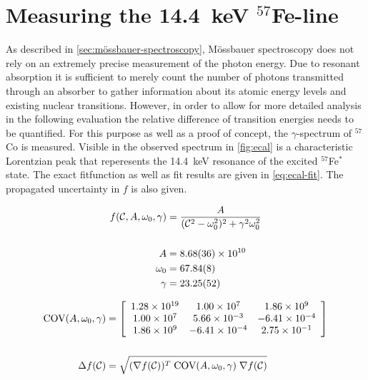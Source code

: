 
\section{Measuring the \SI{14.4}{\kilo\electronvolt} $^{57}$Fe-line}
\label{sec:ecal}

As described in \autoref{sec:mössbauer-spectroscopy}, Mössbauer spectroscopy does not
rely on an extremely precise measurement of the photon energy. Due to resonant
absorption it is sufficient to merely count the number of photons transmitted through
an absorber to gather information about its atomic energy levels and existing nuclear
transitions. However, in order to allow for more detailed analysis in the following
evaluation the relative difference of transition energies needs to be quantified.
For this purpose as well as a proof of concept, the $\gamma$-spectrum of $^{57}$Co is
measured. Visible in the observed spectrum in \autoref{fig:ecal} is a characteristic
Lorentzian peak that reperesents the \SI{14.4}{\kilo\electronvolt} resonance of the 
excited $^{57}$Fe$^{*}$ state. The exact fitfunction as well as fit results are given
in \autoref{eq:ecal-fit}. The propagated uncertainty in $f$ is also given.

\begin{align}
\label{eq:ecal-fit}
f(\mathcal{C},A,\omega_0,\gamma) &= \frac{A}{(\mathcal{C}^2-\omega_0^2)^2 + \gamma^2\omega_0^2} \\[15pt]
A &= \SI{8.68\pm 0.36e+10}{} \\
\omega_0 &= \SI{67.84\pm 0.08}{} \\
\gamma &= \SI{23.25\pm 0.52}{}
\end{align}

\begin{align*}
\text{COV}(A,\omega_0,\gamma) &=
\left[
\begin{array}{c c c}
1.28\times10^{19} & 1.00\times10^{7} & 1.86\times10^{9} \\
1.00\times10^{7} & 5.66\times10^{-3} & -6.41\times10^{-4} \\
1.86\times10^{9} & -6.41\times10^{-4} & 2.75\times10^{-1} \\
\end{array}
\right] \\[15pt]
\Delta f(\mathcal{C}) &= \sqrt{ (\nabla f(\mathcal{C}))^T\;\text{COV}(A,\omega_0,\gamma)\;\nabla f(\mathcal{C})}
\end{align*}

